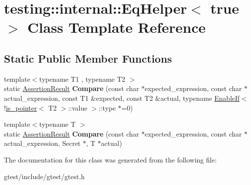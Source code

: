 \hypertarget{classtesting_1_1internal_1_1EqHelper_3_01true_01_4}{}\section{testing\+:\+:internal\+:\+:Eq\+Helper$<$ true $>$ Class Template Reference}
\label{classtesting_1_1internal_1_1EqHelper_3_01true_01_4}
\subsection*{Static Public Member Functions}
\begin{DoxyCompactItemize}
\item 
\mbox{\label{classtesting_1_1internal_1_1EqHelper_3_01true_01_4_a70d6d7e3cb1df06ad6114f25e843fd6d}} 
{\footnotesize template$<$typename T1 , typename T2 $>$ }\\static \hyperlink{classtesting_1_1AssertionResult}{Assertion\+Result} {\bfseries Compare} (const char $\ast$expected\+\_\+expression, const char $\ast$actual\+\_\+expression, const T1 \&expected, const T2 \&actual, typename \hyperlink{structtesting_1_1internal_1_1EnableIf}{Enable\+If}$<$!\hyperlink{structtesting_1_1internal_1_1is__pointer}{is\+\_\+pointer}$<$ T2 $>$\+::value $>$\+::type $\ast$=0)
\item 
\mbox{\label{classtesting_1_1internal_1_1EqHelper_3_01true_01_4_ab38e840297adb48f18767a1a99187fb3}} 
{\footnotesize template$<$typename T $>$ }\\static \hyperlink{classtesting_1_1AssertionResult}{Assertion\+Result} {\bfseries Compare} (const char $\ast$expected\+\_\+expression, const char $\ast$actual\+\_\+expression, Secret $\ast$, T $\ast$actual)
\end{DoxyCompactItemize}


The documentation for this class was generated from the following file\+:\begin{DoxyCompactItemize}
\item 
gtest/include/gtest/gtest.\+h\end{DoxyCompactItemize}
